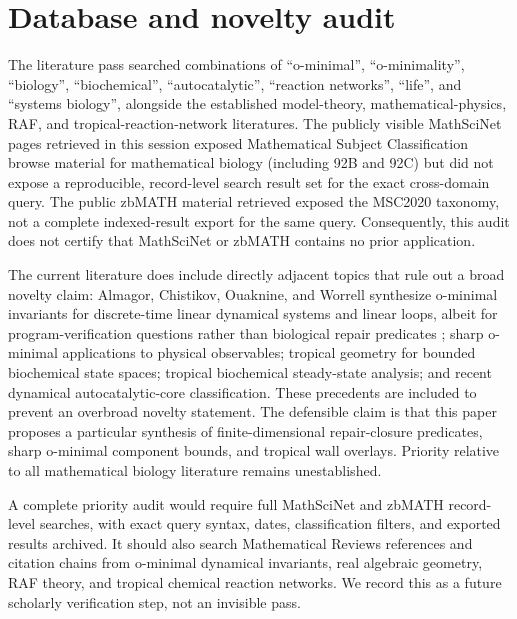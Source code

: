 \documentclass[11pt,a4paper]{article}
\theoremstyle{definition}
\theoremstyle{remark}
\begin{document}
\section{Database and novelty audit}
The literature pass searched combinations of ``o-minimal'', ``o-minimality'', ``biology'', ``biochemical'', ``autocatalytic'', ``reaction networks'', ``life'', and ``systems biology'', alongside the established model-theory, mathematical-physics, RAF, and tropical-reaction-network literatures. The publicly visible MathSciNet pages retrieved in this session exposed Mathematical Subject Classification browse material for mathematical biology (including 92B and 92C) but did not expose a reproducible, record-level search result set for the exact cross-domain query. The public zbMATH material retrieved exposed the MSC2020 taxonomy, not a complete indexed-result export for the same query. Consequently, this audit does not certify that MathSciNet or zbMATH contains no prior application.

The current literature does include directly adjacent topics that rule out a broad novelty claim: Almagor, Chistikov, Ouaknine, and Worrell synthesize o-minimal invariants for discrete-time linear dynamical systems and linear loops, albeit for program-verification questions rather than biological repair predicates \cite{almagor2022}; sharp o-minimal applications to physical observables; tropical geometry for bounded biochemical state spaces; tropical biochemical steady-state analysis; and recent dynamical autocatalytic-core classification. These precedents are included to prevent an overbroad novelty statement. The defensible claim is that this paper proposes a particular synthesis of finite-dimensional repair-closure predicates, sharp o-minimal component bounds, and tropical wall overlays. Priority relative to all mathematical biology literature remains unestablished.

A complete priority audit would require full MathSciNet and zbMATH record-level searches, with exact query syntax, dates, classification filters, and exported results archived. It should also search Mathematical Reviews references and citation chains from o-minimal dynamical invariants, real algebraic geometry, RAF theory, and tropical chemical reaction networks. We record this as a future scholarly verification step, not an invisible pass.
\end{document}
